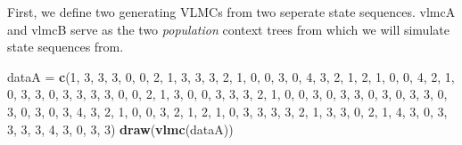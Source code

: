 \documentclass[
]{article}
\newenvironment{Shaded}{\begin{snugshade}}{\end{snugshade}}
\newcommand{\DecValTok}[1]{\textcolor[rgb]{0.00,0.00,0.81}{#1}}
\newcommand{\FunctionTok}[1]{\textcolor[rgb]{0.13,0.29,0.53}{\textbf{#1}}}
\newcommand{\NormalTok}[1]{#1}
\newcommand{\OtherTok}[1]{\textcolor[rgb]{0.56,0.35,0.01}{#1}}
\begin{document}
First, we define two generating VLMCs from two seperate state sequences.
vlmcA and vlmcB serve as the two \emph{population} context trees from
which we will simulate state sequences from.

\begin{Shaded}
\begin{Highlighting}[]
\NormalTok{dataA }\OtherTok{=} \FunctionTok{c}\NormalTok{(}\DecValTok{1}\NormalTok{, }\DecValTok{3}\NormalTok{, }\DecValTok{3}\NormalTok{, }\DecValTok{3}\NormalTok{, }\DecValTok{0}\NormalTok{, }\DecValTok{0}\NormalTok{, }\DecValTok{2}\NormalTok{, }\DecValTok{1}\NormalTok{, }\DecValTok{3}\NormalTok{, }\DecValTok{3}\NormalTok{, }\DecValTok{3}\NormalTok{, }\DecValTok{2}\NormalTok{, }\DecValTok{1}\NormalTok{, }\DecValTok{0}\NormalTok{, }\DecValTok{0}\NormalTok{, }\DecValTok{3}\NormalTok{, }\DecValTok{0}\NormalTok{, }\DecValTok{4}\NormalTok{, }\DecValTok{3}\NormalTok{, }\DecValTok{2}\NormalTok{, }\DecValTok{1}\NormalTok{, }\DecValTok{2}\NormalTok{, }\DecValTok{1}\NormalTok{, }\DecValTok{0}\NormalTok{, }\DecValTok{0}\NormalTok{, }\DecValTok{4}\NormalTok{, }\DecValTok{2}\NormalTok{, }\DecValTok{1}\NormalTok{, }\DecValTok{0}\NormalTok{, }\DecValTok{3}\NormalTok{, }\DecValTok{3}\NormalTok{, }\DecValTok{0}\NormalTok{, }\DecValTok{3}\NormalTok{, }\DecValTok{3}\NormalTok{, }\DecValTok{3}\NormalTok{, }\DecValTok{3}\NormalTok{, }\DecValTok{0}\NormalTok{, }\DecValTok{0}\NormalTok{, }\DecValTok{2}\NormalTok{, }\DecValTok{1}\NormalTok{, }\DecValTok{3}\NormalTok{, }\DecValTok{0}\NormalTok{, }\DecValTok{0}\NormalTok{, }\DecValTok{3}\NormalTok{, }\DecValTok{3}\NormalTok{, }\DecValTok{3}\NormalTok{, }\DecValTok{2}\NormalTok{, }\DecValTok{1}\NormalTok{, }\DecValTok{0}\NormalTok{, }\DecValTok{0}\NormalTok{, }\DecValTok{3}\NormalTok{, }\DecValTok{0}\NormalTok{, }\DecValTok{3}\NormalTok{, }\DecValTok{3}\NormalTok{, }\DecValTok{0}\NormalTok{, }\DecValTok{3}\NormalTok{, }\DecValTok{0}\NormalTok{, }\DecValTok{3}\NormalTok{, }\DecValTok{3}\NormalTok{, }\DecValTok{0}\NormalTok{, }\DecValTok{3}\NormalTok{, }\DecValTok{0}\NormalTok{, }\DecValTok{3}\NormalTok{, }\DecValTok{0}\NormalTok{, }\DecValTok{3}\NormalTok{, }\DecValTok{4}\NormalTok{, }\DecValTok{3}\NormalTok{, }\DecValTok{2}\NormalTok{, }\DecValTok{1}\NormalTok{, }\DecValTok{0}\NormalTok{, }\DecValTok{0}\NormalTok{, }\DecValTok{3}\NormalTok{, }\DecValTok{2}\NormalTok{, }\DecValTok{1}\NormalTok{, }\DecValTok{2}\NormalTok{, }\DecValTok{1}\NormalTok{, }\DecValTok{0}\NormalTok{, }\DecValTok{3}\NormalTok{, }\DecValTok{3}\NormalTok{, }\DecValTok{3}\NormalTok{, }\DecValTok{3}\NormalTok{, }\DecValTok{2}\NormalTok{, }\DecValTok{1}\NormalTok{, }\DecValTok{3}\NormalTok{, }\DecValTok{3}\NormalTok{, }\DecValTok{0}\NormalTok{, }\DecValTok{2}\NormalTok{, }\DecValTok{1}\NormalTok{, }\DecValTok{4}\NormalTok{, }\DecValTok{3}\NormalTok{, }\DecValTok{0}\NormalTok{, }\DecValTok{3}\NormalTok{, }\DecValTok{3}\NormalTok{, }\DecValTok{3}\NormalTok{, }\DecValTok{3}\NormalTok{, }\DecValTok{4}\NormalTok{, }\DecValTok{3}\NormalTok{, }\DecValTok{0}\NormalTok{, }\DecValTok{3}\NormalTok{, }\DecValTok{3}\NormalTok{)}
\FunctionTok{draw}\NormalTok{(}\FunctionTok{vlmc}\NormalTok{(dataA))}
\end{Highlighting}
\end{Shaded}
\end{document}
